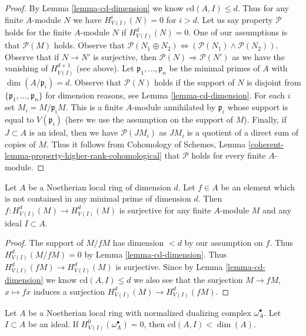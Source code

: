 \begin{proof}
By Lemma \ref{lemma-cd-dimension} we know $\text{cd}(A, I) \leq d$.
Thus for any finite $A$-module $N$ we have $H^i_{V(I)}(N) = 0$
for $i > d$. Let us say property $\mathcal{P}$ holds for the
finite $A$-module $N$ if $H^d_{V(I)}(N) = 0$.
One of our assumptions is that $\mathcal{P}(M)$ holds.
Observe that $\mathcal{P}(N_1 \oplus N_2)
\Leftrightarrow (\mathcal{P}(N_1) \wedge \mathcal{P}(N_2))$.
Observe that if $N \to N'$ is surjective, then
$\mathcal{P}(N) \Rightarrow \mathcal{P}(N')$ as we
have the vanishing of $H^{d + 1}_{V(I)}$ (see above).
Let $\mathfrak p_1, \ldots, \mathfrak p_n$ be the
minimal primes of $A$ with $\dim(A/\mathfrak p_i) = d$.
Observe that $\mathcal{P}(N)$ holds if the support
of $N$ is disjoint from $\{\mathfrak p_1, \ldots, \mathfrak p_n\}$
for dimension reasons, see Lemma \ref{lemma-cd-dimension}.
For each $i$ set $M_i = M/\mathfrak p_i M$.
This is a finite $A$-module annihilated by $\mathfrak p_i$
whose support is equal to
$V(\mathfrak p_i)$ (here we use the assumption on the support of $M$).
Finally, if $J \subset A$ is an ideal, then we have $\mathcal{P}(JM_i)$
as $JM_i$ is a quotient of a direct sum of copies of $M$.
Thus it follows from Cohomology of Schemes, Lemma
\ref{coherent-lemma-property-higher-rank-cohomological}
that $\mathcal{P}$ holds for every finite $A$-module.
\end{proof}

\begin{lemma}
\label{lemma-top-coh-divisible}
Let $A$ be a Noetherian local ring of dimension $d$. Let $f \in A$
be an element which is not contained in any minimal prime of
dimension $d$. Then $f : H^d_{V(I)}(M) \to H^d_{V(I)}(M)$
is surjective for any finite $A$-module $M$ and any ideal $I \subset A$.
\end{lemma}

\begin{proof}
The support of $M/fM$ has dimension $< d$ by our assumption on $f$.
Thus $H^d_{V(I)}(M/fM) = 0$ by Lemma \ref{lemma-cd-dimension}.
Thus $H^d_{V(I)}(fM) \to H^d_{V(I)}(M)$ is surjective.
Since by Lemma \ref{lemma-cd-dimension} we know $\text{cd}(A, I) \leq d$
we also see that the surjection $M \to fM$, $x \mapsto fx$
induces a surjection $H^d_{V(I)}(M) \to H^d_{V(I)}(fM)$.
\end{proof}

\begin{lemma}
\label{lemma-cd-bound-dualizing}
Let $A$ be a Noetherian local ring with
normalized dualizing complex $\omega_A^\bullet$.
Let $I \subset A$ be an ideal.
If $H^0_{V(I)}(\omega_A^\bullet) = 0$, then $\text{cd}(A, I) < \dim(A)$.
\end{lemma}

